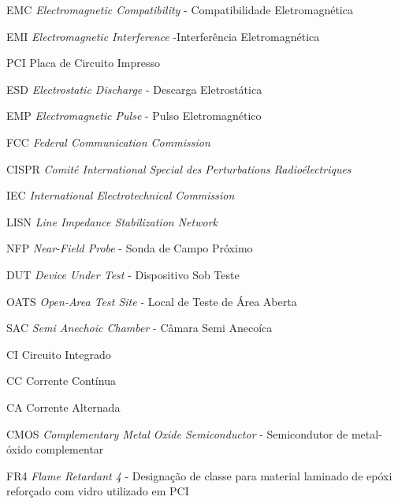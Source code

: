 \documentclass{ifscTCC} %
\begin{document}
\listoffigures*
\cleardoublepage

\listoftables*
\cleardoublepage

\begin{siglas}
   \item[EMC] \textit{Electromagnetic Compatibility} - Compatibilidade Eletromagnética
   \item[EMI] \textit{Electromagnetic Interference} -Interferência Eletromagnética
   \item[PCI] Placa de Circuito Impresso
   \item[ESD] \textit{Electrostatic Discharge} - Descarga Eletrostática
   \item[EMP] \textit{Electromagnetic Pulse} - Pulso Eletromagnético
   \item[FCC] \textit{Federal Communication Commission}
   \item[CISPR] \textit{Comité International Special des Perturbations Radioélectriques}
   \item[IEC] \textit{International Electrotechnical Commission}
   \item[LISN] \textit{Line Impedance Stabilization Network}
   \item[NFP] \textit{Near-Field Probe} - Sonda de Campo Próximo
   \item[DUT] \textit{Device Under Test} - Dispositivo Sob Teste
   \item[OATS] \textit{Open-Area Test Site} - Local de Teste de Área Aberta
   \item[SAC] \textit{Semi Anechoic Chamber} - Câmara Semi Anecoíca
   \item[CI] Circuito Integrado
   \item[CC] Corrente Contínua
   \item[CA] Corrente Alternada
   \item[CMOS] \textit{Complementary Metal Oxide Semiconductor} - Semicondutor de metal-óxido complementar
   \item[FR4] \textit{Flame Retardant 4} - Designação de classe para material laminado de epóxi reforçado com vidro utilizado em PCI

\end{siglas}
\end{document}
